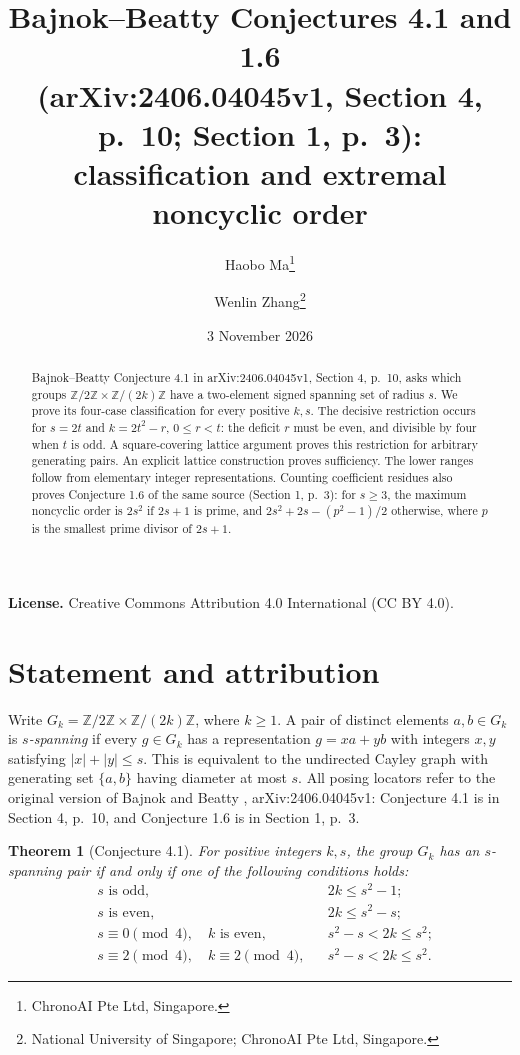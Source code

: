 \documentclass[11pt]{article}
\title{Bajnok--Beatty Conjectures 4.1 and 1.6\protect\\
(arXiv:2406.04045v1, Section 4, p.~10; Section 1, p.~3):\protect\\
classification and extremal noncyclic order}
\author{Haobo Ma\thanks{ChronoAI Pte Ltd, Singapore.}\and
Wenlin Zhang\thanks{National University of Singapore; ChronoAI Pte Ltd, Singapore.}}
\date{3 November 2026}
\newtheorem{theorem}{Theorem}
\newcommand{\Z}{\mathbb Z}
\newcommand{\Gk}{G_k}
\begin{document}
\maketitle
\begin{abstract}
Bajnok--Beatty Conjecture 4.1 in arXiv:2406.04045v1, Section 4,
p.~10, asks which groups
$\Z/2\Z\times\Z/(2k)\Z$ have a two-element signed spanning set of radius
$s$. We prove its four-case classification for every positive $k,s$.
The decisive restriction occurs for $s=2t$ and $k=2t^2-r$, $0\le r<t$:
the deficit $r$ must be even, and divisible by four when $t$ is odd.
A square-covering lattice argument proves this restriction for arbitrary
generating pairs. An explicit lattice construction proves sufficiency.
The lower ranges follow from elementary integer representations.
Counting coefficient residues also proves Conjecture 1.6 of the same
source (Section 1, p.~3): for $s\ge3$, the maximum noncyclic order is
$2s^2$ if $2s+1$ is prime, and $2s^2+2s-(p^2-1)/2$ otherwise,
where $p$ is the smallest prime divisor of $2s+1$.
\end{abstract}
\noindent\textbf{License.} Creative Commons Attribution 4.0 International
(CC BY 4.0).

\section{Statement and attribution}
Write $\Gk=\Z/2\Z\times\Z/(2k)\Z$, where $k\ge1$. A pair of
distinct elements $a,b\in\Gk$ is \emph{$s$-spanning} if every $g\in\Gk$
has a representation $g=xa+yb$ with integers $x,y$ satisfying
$|x|+|y|\le s$. This is equivalent to the undirected Cayley graph with
generating set $\{a,b\}$ having diameter at most $s$.
All posing locators refer to the original version of Bajnok and Beatty
\cite{BB}, arXiv:2406.04045v1: Conjecture 4.1 is in Section 4, p.~10,
and Conjecture 1.6 is in Section 1, p.~3.

\begin{theorem}[Conjecture 4.1]\label{thm:main}
For positive integers $k,s$, the group $\Gk$ has an $s$-spanning pair
if and only if one of the following conditions holds:
\begin{align*}
&s\text{ is odd}, &&2k\le s^2-1;\\
&s\text{ is even}, &&2k\le s^2-s;\\
&s\equiv0\pmod4,\quad k\text{ is even},
&&s^2-s<2k\le s^2;\\
&s\equiv2\pmod4,\quad k\equiv2\pmod4,
&&s^2-s<2k\le s^2.
\end{align*}
\end{theorem}
\end{document}
